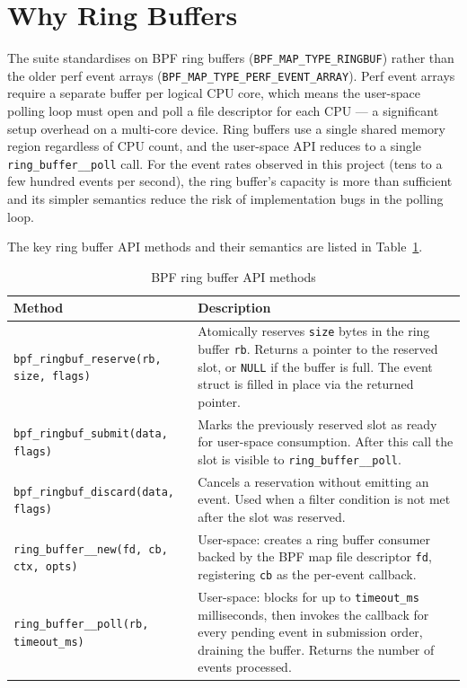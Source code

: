 \documentclass{mnitjaipur}
\begin{document}
\section{Why Ring Buffers}
The suite standardises on BPF ring buffers (\texttt{BPF\_MAP\_TYPE\_RINGBUF}) rather than the older perf event arrays (\texttt{BPF\_MAP\_TYPE\_PERF\_EVENT\_ARRAY}). Perf event arrays require a separate buffer per logical CPU core, which means the user-space polling loop must open and poll a file descriptor for each CPU — a significant setup overhead on a multi-core device. Ring buffers use a single shared memory region regardless of CPU count, and the user-space API reduces to a single \texttt{ring\_buffer\_\_poll} call. For the event rates observed in this project (tens to a few hundred events per second), the ring buffer's capacity is more than sufficient and its simpler semantics reduce the risk of implementation bugs in the polling loop.

The key ring buffer API methods and their semantics are listed in Table~\ref{tab:ringbuf-api}.

\begin{table}[H]
  \centering
  \caption{BPF ring buffer API methods}
  \label{tab:ringbuf-api}
  \begin{tabular}{|p{}|p{}|}
    \hline
    \textbf{Method} & \textbf{Description} \\ \hline
    \texttt{bpf\_ringbuf\_reserve(rb, size, flags)} & Atomically reserves \texttt{size} bytes in the ring buffer \texttt{rb}. Returns a pointer to the reserved slot, or \texttt{NULL} if the buffer is full. The event struct is filled in place via the returned pointer. \\ \hline
    \texttt{bpf\_ringbuf\_submit(data, flags)} & Marks the previously reserved slot as ready for user-space consumption. After this call the slot is visible to \texttt{ring\_buffer\_\_poll}. \\ \hline
    \texttt{bpf\_ringbuf\_discard(data, flags)} & Cancels a reservation without emitting an event. Used when a filter condition is not met after the slot was reserved. \\ \hline
    \texttt{ring\_buffer\_\_new(fd, cb, ctx, opts)} & User-space: creates a ring buffer consumer backed by the BPF map file descriptor \texttt{fd}, registering \texttt{cb} as the per-event callback. \\ \hline
    \texttt{ring\_buffer\_\_poll(rb, timeout\_ms)} & User-space: blocks for up to \texttt{timeout\_ms} milliseconds, then invokes the callback for every pending event in submission order, draining the buffer. Returns the number of events processed. \\ \hline
  \end{tabular}
\end{table}
\end{document}
